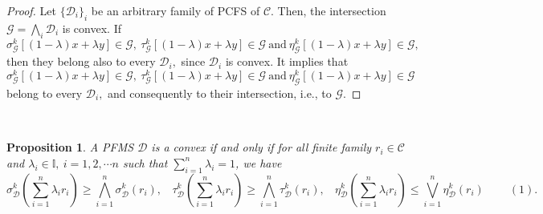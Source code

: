 \documentclass[12pt,letterpaper]{amsart}
\theoremstyle{plain}
\newtheorem{proposition}{Proposition}[section]
\theoremstyle{definition}
\numberwithin{equation}{section}
\begin{document}
\begin{proof}
Let $\lbrace \mathcal{D}_{i} \rbrace_{i}$ be an arbitrary family of PCFS of $\mathcal{C}$. Then, the intersection $\mathcal{G} = \bigwedge_{i} \mathcal{D}_i$ is convex. If $$\sigma^k_{\mathcal{G}}[(1 - \lambda)x + \lambda y] \in \mathcal{G},~ \tau^k_{\mathcal{G}}[(1 - \lambda)x + \lambda y] \in \mathcal{G}~ \text{and}~ \eta^k_{\mathcal{G}}[(1 - \lambda)x + \lambda y] \in \mathcal{G},$$ then they belong also to every $\mathcal{D}_i,$ since $\mathcal{D}_i$ is convex. It implies that $$\sigma^k_{\mathcal{G}}[(1 - \lambda)x + \lambda y] \in \mathcal{G},~ \tau^k_{\mathcal{G}}[(1 - \lambda)x + \lambda y] \in \mathcal{G}~ \text{and}~ \eta^k_{\mathcal{G}}[(1 - \lambda)x + \lambda y] \in \mathcal{G}$$ belong to every $\mathcal{D}_i,$ and consequently to their intersection, i.e., to $\mathcal{G}$. 
\end{proof}
\ \\
\begin{proposition} \label{k} 
A PFMS $\mathcal{D}$ is a convex if and only if for all finite family $r_{i} \in \mathcal{C}$ and $\lambda_{i} \in \mathbb{I},~ i = 1, 2, \cdots n$ such that $\sum \limits_{i=1}^{n} \lambda_i = 1$, we have $$\sigma^k_{\mathcal{D}} \left(\sum \limits_{i=1}^{n} \lambda_{i} r_{i} \right) \geq \bigwedge^{n}_{i=1} \sigma^k_{\mathcal{D}} (r_i),~~~~\tau^k_{\mathcal{D}} \left(\sum \limits_{i=1}^{n} \lambda_{i} r_{i} \right) \geq \bigwedge^{n}_{i=1} \tau^k_{\mathcal{D}} (r_i), ~~~~\eta^k_{\mathcal{D}} \left(\sum \limits_{i=1}^{n} \lambda_{i} r_{i} \right) \leq \bigvee^{n}_{i=1} \eta^k_{\mathcal{D}} (r_i) \ \ \ \ \ \ \ \ \ \ (1).$$ 
\end{proposition}
\ \\
\end{document}
